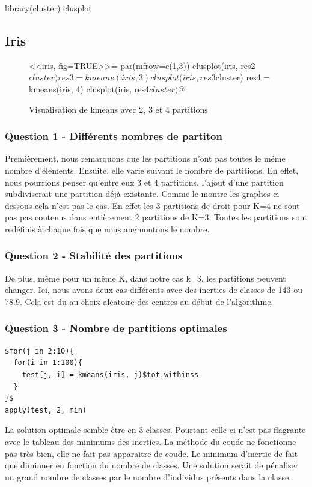 \documentclass{article}\usepackage[]{graphicx}\usepackage[]{color}
\begin{document}
library(cluster)
clusplot 
\subsection*{Iris}
\begin{figure}
<<iris, fig=TRUE>>=
par(mfrow=c(1,3))
clusplot(iris, res2$cluster)
res3 = kmeans(iris, 3)
clusplot(iris, res3$cluster)
res4 = kmeans(iris, 4)
clusplot(iris, res4$cluster)
@$
\caption{Visualisation de kmeans avec 2, 3 et 4 partitions}
\end{figure}
\subsubsection*{Question 1 - Différents nombres de partiton}
Premièrement, nous remarquons que les partitions n'ont pas toutes le même nombre d'éléments. 
Ensuite, elle varie suivant le nombre de partitions. En effet, nous pourrions penser qu'entre eux 3 et 4 partitions, l'ajout d'une partition subdiviserait une partition déjà existante. Comme le montre les graphes ci dessous cela n'est pas le cas. En effet les 3 partitions de droit pour K=4 ne sont pas pas contenus dans entièrement 2 partitions de K=3. Toutes les partitions sont redéfinis à chaque fois que nous augmontons le nombre.   
\subsubsection*{Question 2 - Stabilité des partitions}
De plus, même pour un même K, dans notre cas k=3, les partitions peuvent changer. Ici, nous avons deux cas différents avec des inerties de classes de 143 ou 78.9. Cela est du au choix aléatoire des centres au début de l'algorithme.
\subsubsection*{Question 3 - Nombre de partitions optimales}

\begin{verbatim}
$for(j in 2:10){
  for(i in 1:100){
    test[j, i] = kmeans(iris, j)$tot.withinss
  }
}$
apply(test, 2, min)
\end{verbatim}
La solution optimale semble être en 3 classes. Pourtant celle-ci n'est pas flagrante avec le tableau des minimums des inerties. La méthode du coude ne fonctionne pas très bien, elle ne fait pas apparaitre de coude. Le minimum d'inertie de  fait que diminuer en fonction du nombre de classes. 
Une solution serait de pénaliser un grand nombre de classes par le nombre d'individus présents dans la classe.
\end{document}
